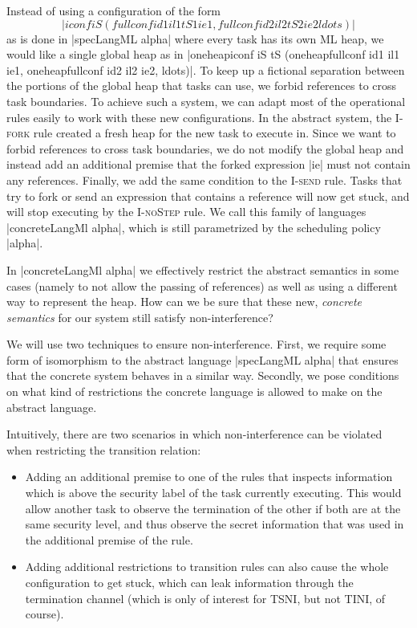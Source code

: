Instead of using a configuration of the form
\[|iconf iS (fullconf id1 il1 tS1 ie1, fullconf id2 il2 tS2 ie2 ldots)|\]
as is done in |specLangML alpha|
where every task has its
own ML heap, we would like a single global heap as in
|oneheapiconf iS tS (oneheapfullconf id1 il1 ie1, oneheapfullconf id2 il2 ie2, ldots)|.
To keep up a fictional separation between the portions
of the global heap that tasks can use, we forbid references to
cross task boundaries.  To achieve such a system, we can
adapt most of the operational rules easily to work with these
new configurations.  In the abstract system, the \textsc{I-fork}
rule created a fresh heap for the new task to execute in.  Since we
want to forbid references to cross task boundaries, we do not modify
the global heap and instead add an additional premise that the forked
expression |ie| must not contain any references.
Finally, we add the same condition to the \textsc{I-send} rule.
Tasks that try to fork or send an expression that contains a
reference will now get stuck, and will stop executing by the
\textsc{I-noStep} rule.
We call this family of languages |concreteLangMl alpha|, which
is still parametrized by the scheduling policy |alpha|.


In |concreteLangMl alpha| we
effectively restrict the abstract semantics in some cases (namely
to not allow the passing of references) as well as using a different
way to represent the heap.  How can we be sure that these
new, \textit{concrete semantics} for our system still satisfy
non-interference?

We will use two techniques to ensure non-interference.  First,
we require some form of isomorphism to the abstract language
|specLangML alpha| that ensures that the concrete system behaves
in a similar way.  Secondly, we pose conditions on what kind
of restrictions the concrete language is allowed to make
on the abstract language.

Intuitively, there are two scenarios in which non-interference
can be violated when restricting the transition relation:
\begin{itemize}
  \item Adding an additional premise to one of the rules that inspects
  information which is above the security label of the task currently
  executing.  This would allow another task to observe the termination
  of the other if both are at the same security level, and thus observe
  the secret information that was used in the additional
  premise of the rule.
  \item Adding additional restrictions to transition rules can
  also cause the whole configuration to get stuck, which can leak
  information through the termination channel (which is only
  of interest for TSNI, but not TINI, of course).
\end{itemize}

